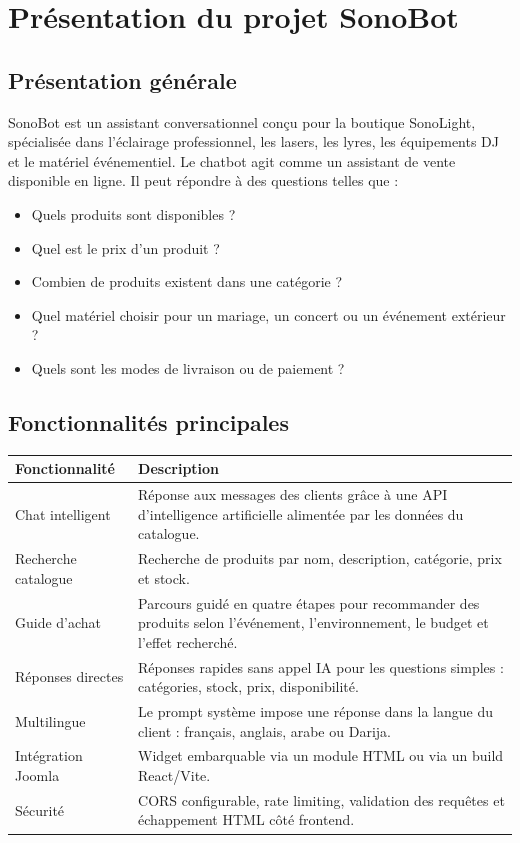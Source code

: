 \documentclass[12pt,a4paper]{report}
\begin{document}
\chapter{Présentation du projet SonoBot}

\section{Présentation générale}

SonoBot est un assistant conversationnel conçu pour la boutique SonoLight, spécialisée dans l'éclairage professionnel, les lasers, les lyres, les équipements DJ et le matériel événementiel. Le chatbot agit comme un assistant de vente disponible en ligne. Il peut répondre à des questions telles que :

\begin{itemize}
    \item Quels produits sont disponibles ?
    \item Quel est le prix d'un produit ?
    \item Combien de produits existent dans une catégorie ?
    \item Quel matériel choisir pour un mariage, un concert ou un événement extérieur ?
    \item Quels sont les modes de livraison ou de paiement ?
\end{itemize}

\section{Fonctionnalités principales}

\begin{longtable}{p{4cm}p{10cm}}
\toprule
\textbf{Fonctionnalité} & \textbf{Description} \\
\midrule
Chat intelligent & Réponse aux messages des clients grâce à une API d'intelligence artificielle alimentée par les données du catalogue. \\
Recherche catalogue & Recherche de produits par nom, description, catégorie, prix et stock. \\
Guide d'achat & Parcours guidé en quatre étapes pour recommander des produits selon l'événement, l'environnement, le budget et l'effet recherché. \\
Réponses directes & Réponses rapides sans appel IA pour les questions simples : catégories, stock, prix, disponibilité. \\
Multilingue & Le prompt système impose une réponse dans la langue du client : français, anglais, arabe ou Darija. \\
Intégration Joomla & Widget embarquable via un module HTML ou via un build React/Vite. \\
Sécurité & CORS configurable, rate limiting, validation des requêtes et échappement HTML côté frontend. \\
\bottomrule
\end{longtable}
\end{document}
